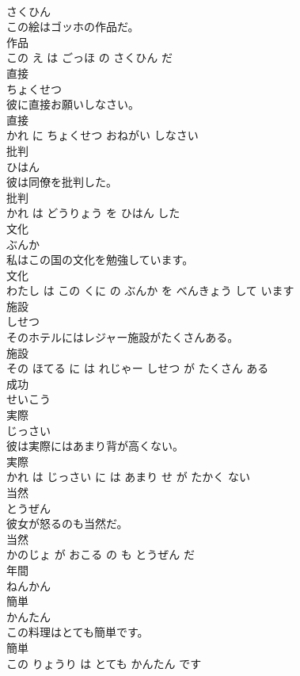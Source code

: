 \documentclass[8pt]{extreport}
\begin{document}
\begin{CJK}{UTF8}{min}
\\	さくひん			
\\	この絵はゴッホの作品だ。	
\\	作品 
\\	この え は ごっほ の さくひん だ			
\\	直接	
\\	ちょくせつ			
\\	彼に直接お願いしなさい。	
\\	直接 
\\	かれ に ちょくせつ おねがい しなさい			
\\	批判	
\\	ひはん			
\\	彼は同僚を批判した。	
\\	批判 
\\	かれ は どうりょう を ひはん した			
\\	文化	
\\	ぶんか			
\\	私はこの国の文化を勉強しています。	
\\	文化 
\\	わたし は この くに の ぶんか を べんきょう して います			
\\	施設	
\\	しせつ			
\\	そのホテルにはレジャー施設がたくさんある。	
\\	施設 
\\	その ほてる に は れじゃー しせつ が たくさん ある			
\\	成功	
\\	せいこう			
\\	実際	
\\	じっさい			
\\	彼は実際にはあまり背が高くない。	
\\	実際 
\\	かれ は じっさい に は あまり せ が たかく ない			
\\	当然	
\\	とうぜん			
\\	彼女が怒るのも当然だ。	
\\	当然 
\\	かのじょ が おこる の も とうぜん だ			
\\	年間	
\\	ねんかん			
\\	簡単	
\\	かんたん			
\\	この料理はとても簡単です。	
\\	簡単 
\\	この りょうり は とても かんたん です			

\end{CJK}
\end{document}
